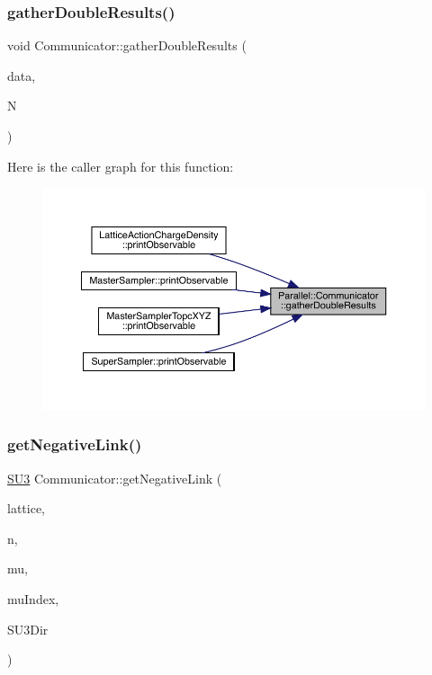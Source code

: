 \subsubsection{\texorpdfstring{gatherDoubleResults()}{gatherDoubleResults()}}
{\footnotesize\ttfamily void Communicator\+::gather\+Double\+Results (\begin{DoxyParamCaption}\item[{double $\ast$}]{data,  }\item[{unsigned int}]{N }\end{DoxyParamCaption})\hspace{0.3cm}{\ttfamily [static]}}

Here is the caller graph for this function\+:
\nopagebreak
\begin{figure}[H]
\begin{center}
\leavevmode
\includegraphics[width=350pt]{class_parallel_1_1_communicator_ae5739683ff54a7c39af6e37920e70ea5_icgraph}
\end{center}
\end{figure}
\mbox{\label{class_parallel_1_1_communicator_ae843d16f4aed13d5b5179a05b717ec88}} 
\subsubsection{\texorpdfstring{getNegativeLink()}{getNegativeLink()}}
{\footnotesize\ttfamily \mbox{\hyperlink{class_s_u3}{S\+U3}} Communicator\+::get\+Negative\+Link (\begin{DoxyParamCaption}\item[{\mbox{\hyperlink{class_lattice}{Lattice}}$<$ \mbox{\hyperlink{class_s_u3}{S\+U3}} $>$ $\ast$}]{lattice,  }\item[{std\+::vector$<$ int $>$}]{n,  }\item[{int}]{mu,  }\item[{int $\ast$}]{mu\+Index,  }\item[{int}]{S\+U3\+Dir }\end{DoxyParamCaption})\hspace{0.3cm}{\ttfamily [static]}}

